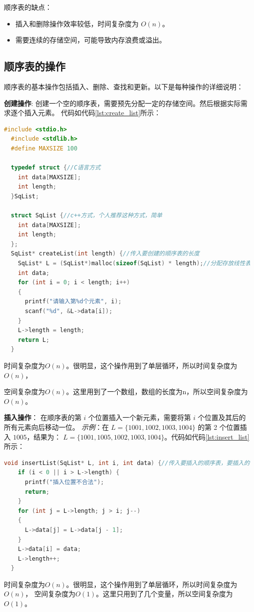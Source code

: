 \documentclass[lang=cn,newtx,10pt,scheme=chinese]{elegantbook}
\begin{document}
顺序表的缺点：
\begin{itemize}
    \item 插入和删除操作效率较低，时间复杂度为 $O(n)$。
    \item 需要连续的存储空间，可能导致内存浪费或溢出。
\end{itemize}

\subsection{顺序表的操作}
顺序表的基本操作包括插入、删除、查找和更新。以下是每种操作的详细说明：

\textbf{创建操作}:
创建一个空的顺序表，需要预先分配一定的存储空间。然后根据实际需求逐个插入元素。
代码如代码\ref{lst:create_list}所示：
\begin{lstlisting}[language=C++, caption={顺序表的创建示例代码}, label={lst:create_list}]
  #include <stdio.h>
  #include <stdlib.h>
  #define MAXSIZE 100

  typedef struct {//C语言方式
    int data[MAXSIZE];
    int length;
  }SqList;

  struct SqList {//c++方式，个人推荐这种方式，简单
    int data[MAXSIZE];
    int length;
  };
  SqList* createList(int length) {//传入要创建的顺序表的长度
    SqList* L = (SqList*)malloc(sizeof(SqList) * length);//分配存放线性表的空间
    int data;
    for (int i = 0; i < length; i++)
    {
      printf("请输入第%d个元素", i);
      scanf("%d", &L->data[i]);
    }
    L->length = length;
    return L;
  }
  \end{lstlisting}

时间复杂度为$O(n)$。很明显，这个操作用到了单层循环，所以时间复杂度为$O(n)$，

空间复杂度为$O(n)$。这里用到了一个数组，数组的长度为n，所以空间复杂度为$O(n)$。

\textbf{插入操作}：
在顺序表的第 $i$ 个位置插入一个新元素，需要将第 $i$ 个位置及其后的所有元素向后移动一位。
\textit{示例}：在 $L = \{1001, 1002, 1003, 1004\}$ 的第 2 个位置插入 $1005$，结果为：
$L = \{1001, 1005, 1002, 1003, 1004\}$。代码如代码\ref{lst:insert_list}所示：
\begin{lstlisting}[language=C++, caption={顺序表的插入示例代码}, label={lst:insert_list}]
  void insertList(SqList* L, int i, int data) {//传入要插入的顺序表，要插入的位置，要插入的数据
    if (i < 0 || i > L->length) {
      printf("插入位置不合法");
      return;
    }
    for (int j = L->length; j > i; j--)
    {
      L->data[j] = L->data[j - 1];
    }
    L->data[i] = data;
    L->length++;
  }
  \end{lstlisting}
时间复杂度为$O(n)$。很明显，这个操作用到了单层循环，所以时间复杂度为$O(n)$，
空间复杂度为$O(1)$。这里只用到了几个变量，所以空间复杂度为$O(1)$。
\end{document}
